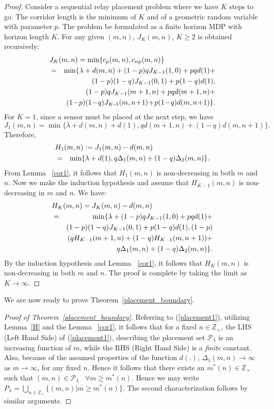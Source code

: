 \documentclass[conference]{IEEEtran}
\begin{document}
\begin{proof}
Consider a sequential relay placement problem where we have $K$ steps to go. The corridor length is the minimum of $K$ and of a geometric random variable with parameter $p$. The problem be formulated as a finite horizon MDP with horizon length $K$. For any given $(m,n)$, $J_{K}(m,n)$, $K\geq 2$ is obtained recursively: 
\begin{eqnarray*}
\lefteqn{J_{K}(m,n) = \min \{c_p(m,n),c_{np}(m,n)\}}\\
&=&\min\{\lambda+d(m,n)+(1-p)qJ_{K-1}(1,0)+pqd(1)+ \\
&& (1-p)(1-q)J_{K-1}(0,1)+p(1-q)d(1),\\
&& (1-p)qJ_{K-1}(m+1,n)+pqd(m+1,n)+\\
&& (1\!-\!p)(1\!-\!q)J_{K\!-\!1}(m,n\!+\!1)\!+\!p(1\!-\!q)d(m,n\!+\!1)\}.
\end{eqnarray*}
For $K=1$, since a sensor must be placed at the next step, we have 
$J_{1}(m,n)=\min\{\lambda+d(m,n)+d(1),qd(m+1,n)+(1-q)d(m,n+1)\}.$
Therefore, 
\begin{eqnarray*}
\lefteqn{H_{1}(m,n):=J_{1}(m,n)-d(m,n)}\\
&=&\min \{\lambda+d(1),q\Delta_1(m,n)+(1-q)\Delta_2(m,n)\}.
\end{eqnarray*}
From Lemma ~\ref{cor1}, it follows that $H_1(m,n)$ is non-decreasing in both $m$ and $n$.
Now we make the induction hypothesis and assume that $H_{K-1}(m,n)$ is non-decreasing in $m$ and $n$. We have:
\begin{eqnarray*}
\lefteqn{H_{K}(m,n)=J_{K}(m,n)-d(m,n)}\\
&=&\min\{\lambda+(1-p)qJ_{K-1}(1,0)+pqd(1)+\\
&&(1-p)(1-q)J_{K-1}(0,1)+p(1-q)d(1),(1-p)\\
&&(qH_{K-1}(m+1,n)+(1-q)H_{K-1}(m,n+1))+\\
&&q\Delta_1(m,n)+(1-q)\Delta_2(m,n)\}.
\end{eqnarray*}
By the induction hypothesis and Lemma ~\ref{cor1}, it follows that $H_{K}(m,n)$ is non-decreasing in both $m$ and $n$. The proof is complete by taking the limit as $ K\rightarrow \infty$. 
\end{proof}

We are now ready to prove Theorem~\ref{placement_boundary}.
\begin{proof}[Proof of Theorem~\ref{placement_boundary}]
Referring to (\ref{placement1}), utilizing Lemma~\ref{H} and the Lemma ~\ref{cor1}, it follows that for a fixed $n\in \mathbb{Z}_+$, the LHS (Left Hand Side) of (\ref{placement1}), describing the placement set $\mathcal{P}_\lambda$ is an increasing function of $m$, while the RHS (Right Hand Side) is a \emph{finite} constant. Also, because of the assumed properties of the function $d(.)$, $\Delta_1(m,n)\rightarrow \infty$ as $m\rightarrow \infty$, for any 
fixed $n$. Hence it follows that there exists an $m^*(n)\in\mathbb{Z}_+$ such that 
$(m,n)\in \mathcal{P}_\lambda\hspace{10pt} \forall m\geq m^*(n)$. Hence we may write 
$P_\lambda=\bigcup_{n\in\mathbb{Z}_+}\{(m,n)|m\geq m^*(n)\}.$
The second characterization follows by similar arguments. 
\end{proof}
\end{document}
